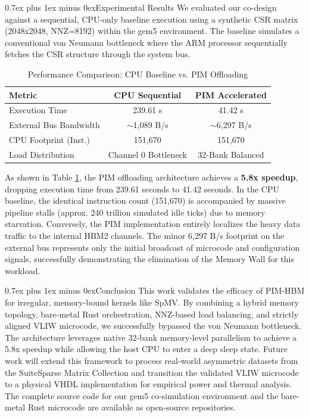 \documentclass[conference]{IEEEtran}
\makeatletter
\renewcommand{\section}{\@startsection{section}{1}{\z@}{3.0ex plus 1.5ex minus 1.5ex}%
{0.7ex plus 1ex minus 0ex}{\normalfont\normalsize\centering\bfseries\scshape}}
\makeatother
\begin{document}
\section{Experimental Results}
We evaluated our co-design against a sequential, CPU-only baseline execution using a synthetic CSR matrix (2048x2048, NNZ=8192) within the gem5 environment. The baseline simulates a conventional von Neumann bottleneck where the ARM processor sequentially fetches the CSR structure through the system bus.

\begin{table}[h]
\renewcommand{\arraystretch}{1.3}
\caption{Performance Comparison: CPU Baseline vs. PIM Offloading}
\label{table_results}
\centering
\begin{tabular}{|l||c|c|}
\hline
\textbf{Metric} & \textbf{CPU Sequential} & \textbf{PIM Accelerated} \\
\hline
Execution Time & 239.61 s & 41.42 s \\
\hline
External Bus Bandwidth & $\sim$1,089 B/s & $\sim$6,297 B/s \\
\hline
CPU Footprint (Inst.) & 151,670 & 151,670 \\
\hline
Load Distribution & Channel 0 Bottleneck & 32-Bank Balanced \\
\hline
\end{tabular}
\end{table}

As shown in Table \ref{table_results}, the PIM offloading architecture achieves a \textbf{5.8x speedup}, dropping execution time from 239.61 seconds to 41.42 seconds. In the CPU baseline, the identical instruction count (151,670) is accompanied by massive pipeline stalls (approx. 240 trillion simulated idle ticks) due to memory starvation. Conversely, the PIM implementation entirely localizes the heavy data traffic to the internal HBM2 channels. The minor 6,297 B/s footprint on the external bus represents only the initial broadcast of microcode and configuration signals, successfully demonstrating the elimination of the Memory Wall for this workload.

\section{Conclusion}
This work validates the efficacy of PIM-HBM for irregular, memory-bound kernels like SpMV. By combining a hybrid memory topology, bare-metal Rust orchestration, NNZ-based load balancing, and strictly aligned VLIW microcode, we successfully bypassed the von Neumann bottleneck. The architecture leverages native 32-bank memory-level parallelism to achieve a 5.8x speedup while allowing the host CPU to enter a deep sleep state. Future work will extend this framework to process real-world asymmetric datasets from the SuiteSparse Matrix Collection and transition the validated VLIW microcode to a physical VHDL implementation for empirical power and thermal analysis. The complete source code for our gem5 co-simulation environment \cite{my_gem5_repo} and the bare-metal Rust microcode \cite{my_pimsys_repo} are available as open-source repositories.
\end{document}
